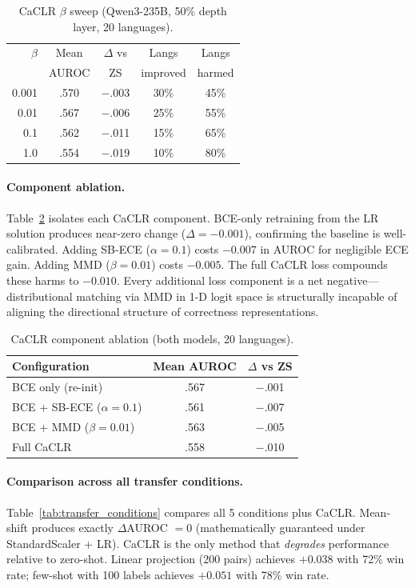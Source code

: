 \documentclass[11pt,a4paper]{article}
\newcommand{\auroc}{AUROC}
\begin{document}
\begin{table}[t]
\centering
\small
\caption{CaCLR $\beta$ sweep (Qwen3-235B, 50\% depth layer, 20 languages).}
\label{tab:beta_sweep}
\begin{tabular}{rcccc}
\toprule
$\beta$ & Mean & $\Delta$ vs & Langs & Langs \\
        & \auroc{} & ZS & improved & harmed \\
\midrule
0.001 & .570 & $-$.003 & 30\% & 45\% \\
0.01  & .567 & $-$.006 & 25\% & 55\% \\
0.1   & .562 & $-$.011 & 15\% & 65\% \\
1.0   & .554 & $-$.019 & 10\% & 80\% \\
\bottomrule
\end{tabular}
\end{table}

\paragraph{Component ablation.}
Table~\ref{tab:component_ablation} isolates each CaCLR component.
BCE-only retraining from the LR solution produces near-zero change ($\Delta = -0.001$), confirming the baseline is well-calibrated.
Adding SB-ECE ($\alpha = 0.1$) costs $-0.007$ in \auroc{} for negligible ECE gain.
Adding MMD ($\beta = 0.01$) costs $-0.005$.
The full CaCLR loss compounds these harms to $-0.010$.
Every additional loss component is a net negative---distributional matching via MMD in 1-D logit space is structurally incapable of aligning the directional structure of correctness representations.

\begin{table}[t]
\centering
\small
\caption{CaCLR component ablation (both models, 20 languages).}
\label{tab:component_ablation}
\begin{tabular}{lcc}
\toprule
Configuration & Mean \auroc{} & $\Delta$ vs ZS \\
\midrule
BCE only (re-init) & .567 & $-$.001 \\
BCE + SB-ECE ($\alpha{=}0.1$) & .561 & $-$.007 \\
BCE + MMD ($\beta{=}0.01$) & .563 & $-$.005 \\
Full CaCLR & .558 & $-$.010 \\
\bottomrule
\end{tabular}
\end{table}

\paragraph{Comparison across all transfer conditions.}
Table~\ref{tab:transfer_conditions} compares all 5 conditions plus CaCLR.
Mean-shift produces exactly $\Delta$\auroc{} $= 0$ (mathematically guaranteed under StandardScaler + LR).
CaCLR is the only method that \emph{degrades} performance relative to zero-shot.
Linear projection (200 pairs) achieves $+0.038$ with 72\% win rate; few-shot with 100 labels achieves $+0.051$ with 78\% win rate.
\end{document}
